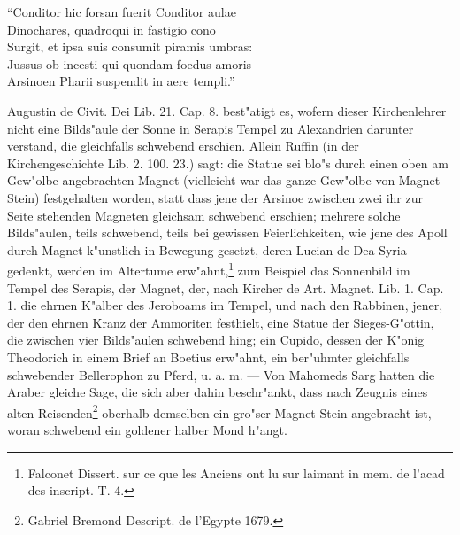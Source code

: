 \documentclass[a4paper, 11pt, oneside, polutonikogreek, german]{article}
\begin{document}
"`Conditor hic forsan fuerit Conditor aulae\\
\hspace*{0.5cm} Dinochares, quadroqui in fastigio cono\\
\hspace*{0.5cm} Surgit, et ipsa suis consumit piramis umbras:\\
\hspace*{0.5cm} Jussus ob incesti qui quondam foedus amoris\\
\hspace*{0.5cm} Arsinoen Pharii suspendit in aere templi."'

Augustin de Civit. Dei Lib. 21. Cap. 8. best"atigt es, wofern dieser Kirchenlehrer nicht eine Bilds"aule der Sonne in Serapis Tempel zu Alexandrien darunter verstand, die gleichfalls schwebend erschien. Allein Ruffin (in der Kirchengeschichte Lib. 2. 100. 23.) sagt: die Statue sei blo"s durch einen oben am Gew"olbe angebrachten Magnet (vielleicht war das ganze Gew"olbe von Magnet-Stein) festgehalten worden, statt dass jene der Arsinoe zwischen zwei ihr zur Seite stehenden Magneten gleichsam schwebend erschien; mehrere solche Bilds"aulen, teils schwebend, teils bei gewissen Feierlichkeiten, wie jene des Apoll durch Magnet k"unstlich in Bewegung gesetzt, deren Lucian de Dea Syria gedenkt, werden im Altertume erw"ahnt,\footnote{Falconet Dissert. sur ce que les Anciens ont lu sur laimant in mem. de l'acad des inscript. T. 4.} zum Beispiel das Sonnenbild im Tempel des Serapis, der Magnet, der, nach Kircher de Art. Magnet. Lib. 1. Cap. 1. die ehrnen K"alber des Jeroboams im Tempel, und nach den Rabbinen, jener, der den ehrnen Kranz der Ammoriten festhielt, eine Statue der Sieges-G"ottin, die zwischen vier Bilds"aulen schwebend hing; ein Cupido, dessen der K"onig Theodorich in einem Brief an Boetius erw"ahnt, ein ber"uhmter gleichfalls schwebender Bellerophon zu Pferd, u. a. m. --- Von Mahomeds Sarg hatten die Araber gleiche Sage, die sich aber dahin beschr"ankt, dass nach Zeugnis eines alten Reisenden\footnote{Gabriel Bremond Descript. de l'Egypte 1679.} oberhalb demselben ein gro"ser Magnet-Stein angebracht ist, woran schwebend ein goldener halber Mond h"angt.
\end{document}
